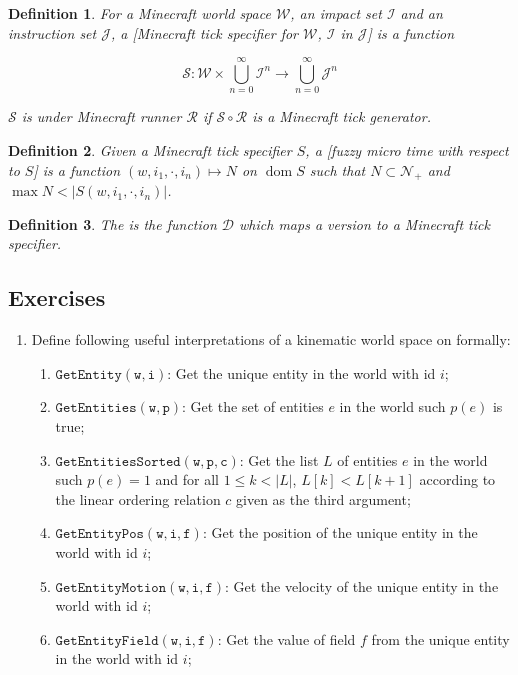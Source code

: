 \documentclass{book}
\newtheorem{definition}{Definition}
\theoremstyle{definition}\newtheorem{mechanism}{Mechanism}
\theoremstyle{remark}\newtheorem*{remark}{Remark}
\begin{document}
\begin{definition}
	For a Minecraft world space $\mathcal W$, an impact set $\mathcal I$ and an instruction set $\mathcal J$, a [Minecraft tick specifier for $\mathcal W$, $\mathcal I$ in $\mathcal J$] is a function
	
	\begin{equation*}
		\mathscr S: \mathcal W \times \bigcup_{n = 0}^{\infty}\mathcal I^n\to \bigcup_{n = 0}^{\infty}\mathcal J^n
	\end{equation*}
	
	$\mathscr S$ is  under Minecraft runner $\mathcal R$ if $\mathscr S \circ \mathscr R$ is a Minecraft tick generator.
\end{definition}

\begin{definition}
	Given a Minecraft tick specifier $S$, a [fuzzy micro time with respect to $S$] is a function $(w, i_1, \cdot, i_n) \mapsto N$ on $\operatorname{dom} S$ such that $N\subset \mathcal N_+$ and $\max N < |S(w, i_1, \cdot, i_n)|$.
\end{definition}

\begin{definition}
	The  is the function $\mathscr D$ which maps a version to a Minecraft tick specifier.
\end{definition}

\subsection*{Exercises}

\begin{enumerate}
	\item Define following useful interpretations of a kinematic world space on formally:
	
	\begin{enumerate}
		\item $\mathtt{GetEntity(w, i)}$: Get the unique entity in the world with id $i$;
		\item $\mathtt{GetEntities(w, p)}$: Get the set of entities $e$ in the world such $p(e)$ is true;
		\item $\mathtt{GetEntitiesSorted(w, p, c)}$: Get the list $L$ of entities $e$ in the world such $p(e) = 1$ and for all $1\le k < |L|$, $L[k] < L[k + 1]$ according to the linear ordering relation $c$ given as the third argument;
		\item $\mathtt{GetEntityPos(w, i, f)}$: Get the position of the unique entity in the world with id $i$;
		\item $\mathtt{GetEntityMotion(w, i, f)}$: Get the velocity of the unique entity in the world with id $i$;
		\item $\mathtt{GetEntityField(w, i, f)}$: Get the value of field $f$ from the unique entity in the world with id $i$;
	\end{enumerate}
\end{enumerate}
\end{document}
